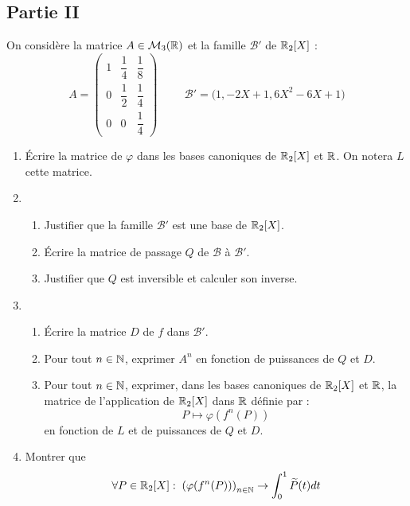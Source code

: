 \subsection*{Partie II}
On considère la matrice $A\in \mathcal M_3(\mathbb{R})$ et la famille $\mathcal B'$ de $\mathbb{R}_2[X]$ : 
\renewcommand{\arraystretch}{2}
\begin{displaymath}
 A = 
\begin{pmatrix}
 1& \dfrac{1}{4} & \dfrac{1}{8} \\
 0& \dfrac{1}{2} & \dfrac{1}{4} \\
 0& 0 & \dfrac{1}{4} 
\end{pmatrix}
\hspace{1cm}
\mathcal B' = \bigr(1,-2X+1,6X^2-6X+1 \bigl)
\end{displaymath}
\begin{enumerate}
  \item \'Ecrire la matrice de $\varphi$ dans les bases canoniques de $\mathbb{R}_2[X]$ et $\mathbb{R}$. On notera $L$ cette matrice.
 
  \item 
\begin{enumerate}
  \item Justifier que la famille $\mathcal B'$ est une base de $\mathbb{R}_2[X]$.
  \item \'Ecrire la matrice de passage $Q$ de $\mathcal B$ à $\mathcal B'$.
  \item Justifier que $Q$ est inversible et calculer son inverse.
\end{enumerate}

\item 
\begin{enumerate}
 \item \'Ecrire la matrice $D$ de $f$ dans $\mathcal B'$.
 \item Pour tout $n\in \mathbb{N}$, exprimer $A^n$ en fonction de puissances de $Q$ et $D$.
 \item Pour tout $n\in \mathbb{N}$, exprimer, dans les bases canoniques de $\mathbb{R}_2[X]$ et $\mathbb{R}$, la matrice de l'application de $\mathbb{R}_2[X]$ dans $\mathbb{R}$ définie par :
\begin{displaymath}
 P \mapsto \varphi(f^n(P))
\end{displaymath}
en fonction de $L$ et de puissances de $Q$ et $D$.
\end{enumerate}

\item Montrer que 
\begin{displaymath}
 \forall P\in \mathbb{R}_2[X] :\;
\left( \varphi(f^n(P))\right)_{n\in \mathbb{N}} \rightarrow  \int_0^1\widetilde{P}(t)dt
\end{displaymath}
\end{enumerate}

